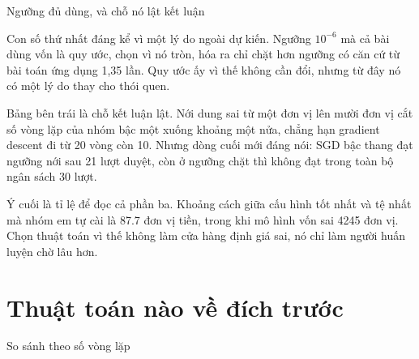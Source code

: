 \documentclass[10pt, aspectratio=169]{beamer}
\begin{document}
\begin{frame}{Ngưỡng đủ dùng, và chỗ nó lật kết luận}
{  Con số thứ nhất đáng kể vì một lý do ngoài dự kiến. Ngưỡng $10^{-6}$ mà cả bài
  dùng vốn là quy ước, chọn vì nó tròn, hóa ra chỉ chặt hơn ngưỡng có căn cứ từ
  bài toán ứng dụng 1,35 lần. Quy ước ấy vì thế không cần đổi, nhưng từ đây nó
  có một lý do thay cho thói quen.

  Bảng bên trái là chỗ kết luận lật. Nới dung sai từ một đơn vị lên mười đơn vị
  cắt số vòng lặp của nhóm bậc một xuống khoảng một nửa, chẳng hạn gradient
  descent đi từ 20 vòng còn 10. Nhưng dòng cuối mới đáng nói: SGD bậc thang đạt
  ngưỡng nới sau 21 lượt duyệt, còn ở ngưỡng chặt thì không đạt trong toàn bộ
  ngân sách 30 lượt.

  Ý cuối là tỉ lệ để đọc cả phần ba. Khoảng cách giữa cấu hình tốt nhất và tệ
  nhất mà nhóm em tự cài là \num{87.7} đơn vị tiền, trong khi mô hình vốn sai
  \num{4245} đơn vị. Chọn thuật toán vì thế không làm cửa hàng định giá sai, nó
  chỉ làm người huấn luyện chờ lâu hơn.}
\end{frame}

\section{Thuật toán nào về đích trước}

\begin{frame}{So sánh theo số vòng lặp}
  \begin{center}\end{center}
\end{frame}
\end{document}
